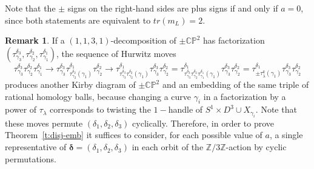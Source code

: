 \documentclass[11pt,a4paper]{amsart}
\newcommand{\CP}{\mathbb{CP}}
\newcommand{\Z}{\mathbb Z}
\newcommand{\de}{\delta}
\newcommand{\ga}{\gamma}
\newcommand{\la}{\lambda}
\newcommand{\x}{\times}
\newcommand{\tr}{tr}
\newcommand{\bde}{\bm{\de}}
\theoremstyle{definition}
\newtheorem{rmk}[thm]{Remark}
\numberwithin{equation}{section}
\begin{document}

Note that the $\pm$ signs on the right-hand sides are plus signs if and only if $a=0$, since both statements are equivalent to $\tr(m_L)=2$. 


\begin{rmk}\label{r:factperm}
If a $(1,1,3,1)$-decomposition of $\pm\CP^2$ has factorization $(\tau_{\ga_3}^{\de_3},\tau_{\ga_2}^{\de_2},\tau_{\ga_1}^{\de_1})$, the sequence of Hurwitz moves 
\[
\tau_{\ga_3}^{\de_3}\tau_{\ga_2}^{\de_2}\tau_{\ga_1}^{\de_1} \rightarrow
\tau_{\ga_3}^{\de_3}\tau_{\tau_{\ga_2}^{\de_2}(\ga_1)}^{\de_1}\tau_{\ga_2}^{\de_2}
\rightarrow
\tau_{\tau_{\ga_3}^{\de_3}\tau_{\ga_2}^{\de_2}(\ga_1)}^{\de_1}\tau_{\ga_3}^{\de_3}\tau_{\ga_2}^{\de_2}=
\tau_{\tau_{\ga_3}^{\de_3}\tau_{\ga_2}^{\de_2}\tau_{\ga_1}^{\de_1}(\ga_1)}^{\de_1}\tau_{\ga_3}^{\de_3}\tau_{\ga_2}^{\de_2}=
\tau_{\pm \tau_{\la}^k(\ga_1)}^{\de_1}\tau_{\ga_3}^{\de_3}\tau_{\ga_2}^{\de_2}
\]
produces another Kirby diagram of $\pm\CP^2$ and an embedding of the same triple of rational homology 
balls, because changing a curve $\ga_i$ in a factorization by a power of $\tau_\la$ corresponds 
to twisting the $1-$handle of $S^1 \x D^3 \cup X_{\ga_i}$. Note that these moves permute 
$(\de_1,\de_2,\de_3)$ cyclically. Therefore, in order to prove Theorem~\ref{t:disj-emb} it suffices to 
consider, for each possible value of $a$, a single 
representative of $\bde=(\de_1,\de_2,\de_3)$ in each orbit of the $\Z/3\Z$-action by cyclic permutations.
\end{rmk} 
\end{document}

